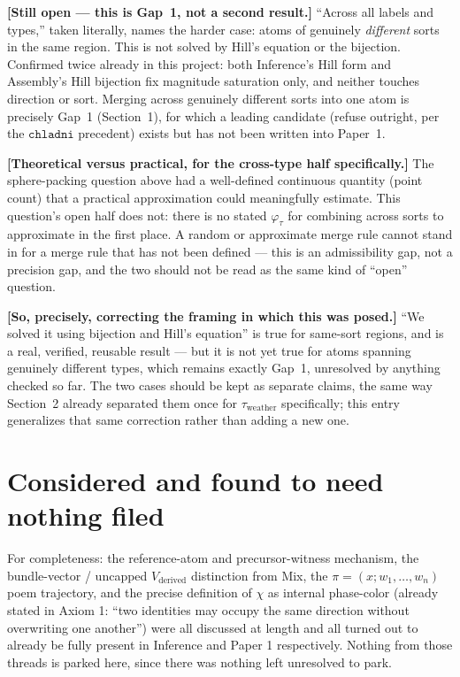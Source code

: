 \documentclass[11pt]{article}
\begin{document}
\textbf{[Still open --- this is Gap~1, not a second result.]} ``Across
all labels and types,'' taken literally, names the harder case: atoms
of genuinely \emph{different} sorts in the same region. This is not
solved by Hill's equation or the bijection. Confirmed twice already
in this project: both Inference's Hill form and Assembly's Hill
bijection fix magnitude saturation only, and neither touches direction
or sort. Merging across genuinely different sorts into one atom is
precisely Gap~1 (Section~1), for which a leading candidate (refuse
outright, per the $\mathtt{chladni}$ precedent) exists but has not
been written into Paper~1.

\textbf{[Theoretical versus practical, for the cross-type half
specifically.]} The sphere-packing question above had a well-defined
continuous quantity (point count) that a practical approximation could
meaningfully estimate. This question's open half does not: there is no
stated $\varphi_\tau$ for combining across sorts to approximate in the
first place. A random or approximate merge rule cannot stand in for a
merge rule that has not been defined --- this is an admissibility gap,
not a precision gap, and the two should not be read as the same kind
of ``open'' question.

\textbf{[So, precisely, correcting the framing in which this was
posed.]} ``We solved it using bijection and Hill's equation'' is true
for same-sort regions, and is a real, verified, reusable result ---
but it is not yet true for atoms spanning genuinely different types,
which remains exactly Gap~1, unresolved by anything checked so far.
The two cases should be kept as separate claims, the same way
Section~2 already separated them once for $\tau_{\text{weather}}$
specifically; this entry generalizes that same correction rather than
adding a new one.

\section{Considered and found to need nothing filed}

For completeness: the reference-atom and precursor-witness mechanism,
the bundle-vector / uncapped $V_{\text{derived}}$ distinction from
Mix, the $\pi=(x;w_1,\ldots,w_n)$ poem trajectory, and the precise
definition of $\chi$ as internal phase-color (already stated in
Axiom 1: ``two identities may occupy the same direction without
overwriting one another'') were all discussed at length and all
turned out to already be fully present in Inference and Paper 1
respectively. Nothing from those threads is parked here, since there
was nothing left unresolved to park.
\end{document}
